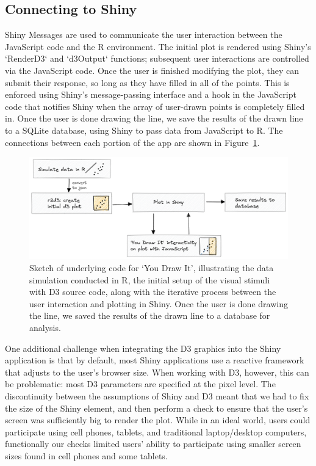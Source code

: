 \documentclass[
  letterpaper,
  DIV=11,
  numbers=noendperiod]{scrartcl}
\newcommand{\svp}[1]{{\textcolor{RedOrange}{#1}}}
\begin{document}
\hypertarget{connecting-to-shiny}{%
\subsection{Connecting to Shiny}\label{connecting-to-shiny}}

Shiny Messages are used to communicate the user interaction between the
JavaScript code and the R environment.
\svp{The initial plot is rendered using Shiny's `RenderD3` and `d3Output` functions; subsequent user interactions are controlled via the JavaScript code. Once the user is finished modifying the plot, they can submit their response, so long as they have filled in all of the points. This is enforced using Shiny's message-passing interface and a hook in the JavaScript code that notifies Shiny when the array of user-drawn points is completely filled in.}
Once the user is done drawing the line, we save the results of the drawn
line to a SQLite database, using Shiny to pass data from JavaScript to
R. The connections between each portion of the app are shown in
Figure~\ref{fig-you-draw-it-code-sketch}.

\begin{figure}

{\centering \includegraphics{images/code-sketch-2.png}

}

\caption{\label{fig-you-draw-it-code-sketch}Sketch of underlying code
for `You Draw It', illustrating the data simulation conducted in R, the
initial setup of the visual stimuli with D3 source code, along with the
iterative process between the user interaction and plotting in Shiny.
Once the user is done drawing the line, we saved the results of the
drawn line to a database for analysis.}

\end{figure}

\svp{One additional challenge when integrating the D3 graphics into the Shiny application is that by default, most Shiny applications use a reactive framework that adjusts to the user's browser size. When working with D3, however, this can be problematic: most D3 parameters are specified at the pixel level. The discontinuity between the assumptions of Shiny and D3 meant that we had to fix the size of the Shiny element, and then perform a check to ensure that the user's screen was sufficiently big to render the plot. While in an ideal world, users could participate using cell phones, tablets, and traditional laptop/desktop computers, functionally our checks limited users' ability to participate using smaller screen sizes found in cell phones and some tablets. }
\end{document}
